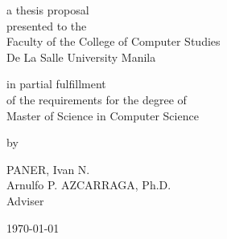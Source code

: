 %
%
%                 

\begin{titlepage}
\centering



\vspace{1.75cm}
a thesis proposal\\
presented to the\\
Faculty of the College of Computer Studies\\
De La Salle University Manila

\vspace{1.75cm}
in partial fulfillment\\
of the requirements for the degree of\\
Master of Science in Computer Science

\vspace{1.75cm}
by\\
\vspace{1cm}

PANER, Ivan N.  \\


\vspace{1.75cm}
Arnulfo P. AZCARRAGA, Ph.D. \\
Adviser

\vspace{1.75cm}
\today
\end{titlepage}
